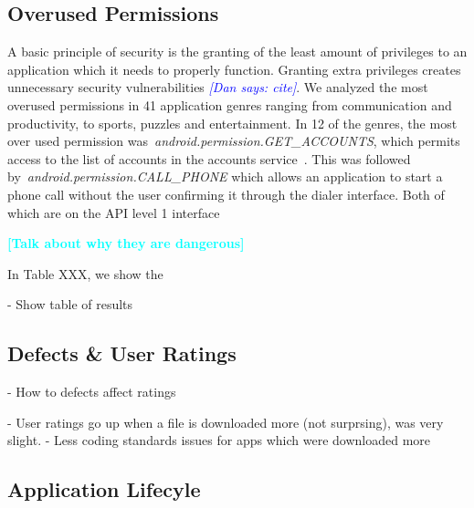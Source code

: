 \documentclass{sig-alternate}
\newcommand{\todo}[1]{\textcolor{cyan}{\textbf{[#1]}}}
\newcommand{\dan}[1]{\textcolor{blue}{{\it [Dan says: #1]}}}
\begin{document}
\subsection{Overused Permissions}


A basic principle of security is the granting of the least amount of privileges to an application which it needs to properly function. Granting extra privileges creates unnecessary security vulnerabilities \dan{cite}. We analyzed the most overused permissions in  41 application genres ranging from communication and productivity, to sports, puzzles and entertainment. In 12 of the genres, the most over used permission was~\emph{android.permission.GET\_ACCOUNTS}, which permits access to the list of accounts in the accounts service~\cite{manifest_url}. This was followed by~\emph{android.permission.CALL\_PHONE} which allows an application to start a phone call without the user confirming it through the dialer interface. Both of which are on the API level 1 interface

\todo{Talk about why they are dangerous}

In Table XXX, we show the 



- Show table of results




\subsection{Defects \& User Ratings}
- How to defects affect ratings

- User ratings go up when a file is downloaded more (not surprsing), was very slight.
- Less coding standards issues for apps which were downloaded more



\subsection{Application Lifecyle}

\end{document}
